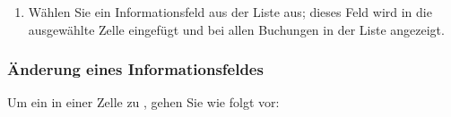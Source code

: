 \begin{enumerate}
	\item Wählen Sie ein Informationsfeld aus der Liste aus; dieses Feld wird in die ausgewählte Zelle eingefügt und bei allen Buchungen in der Liste angezeigt.
\end{enumerate}


\subsubsection{Änderung eines Informationsfeldes\label{transactions-list-fields-modify}}

Um ein  in einer Zelle zu , gehen Sie wie folgt vor:

